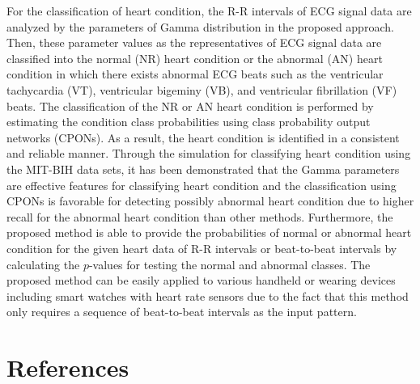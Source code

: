 \documentclass[times,twocolumn,final,authoryear]{elsarticle}
\begin{document}
For the classification of heart condition, the R-R intervals of ECG signal data are analyzed by the parameters of Gamma distribution in the proposed approach. 
Then, these parameter values as the representatives of ECG signal data are classified into the normal (NR) heart condition or the abnormal (AN) heart condition
in which there exists abnormal ECG beats such as the ventricular tachycardia (VT), ventricular bigeminy (VB), and ventricular fibrillation (VF) beats.
The classification of the NR or AN heart condition is performed by estimating
the condition class probabilities using class probability output networks (CPONs). As a result, the heart condition is identified in a consistent and reliable manner. Through the simulation for classifying heart condition using the MIT-BIH data sets, it has been demonstrated that the Gamma parameters are effective features for classifying heart condition and the classification using CPONs is favorable for detecting possibly abnormal heart condition due to higher recall for the abnormal heart condition than other methods. Furthermore, the proposed method is able to provide the probabilities of  normal or abnormal heart condition for the given heart data of R-R intervals or 
beat-to-beat intervals by calculating the $p$-values for testing the normal and abnormal classes.
The proposed method can be easily applied to various handheld or wearing devices including smart watches with heart rate sensors
due to the fact that this method only requires a sequence of beat-to-beat intervals as the input pattern.


\section*{References}
\end{document}
